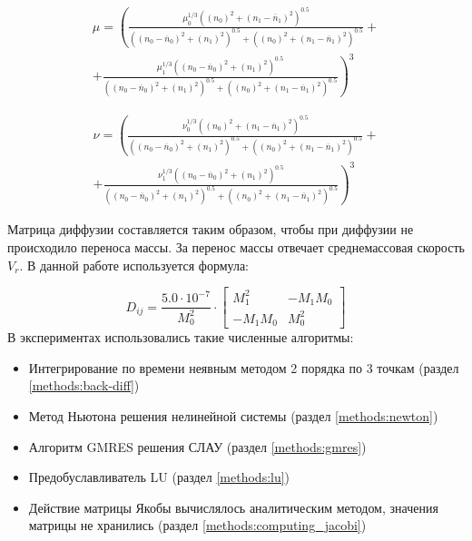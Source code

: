 \begin{multline}
\mu = \left(\frac{\mu_0^{1/3} \left(\left(n_0\right)^{2} + \left(n_1 - \overline n_1\right)^{2}\right)^{0.5}}{\left(\left(n_0 - \overline n_0\right)^{2} + \left(n_1\right)^{2}\right)^{0.5} + \left(\left(n_0\right)^{2} + \left(n_1 - \overline n_1\right)^{2}\right)^{0.5}} + \right.
\\
\left. + \frac{\mu_1^{1/3} \left(\left(n_0 - \overline n_0\right)^{2} + \left(n_1\right)^{2}\right)^{0.5}}{\left(\left(n_0 - \overline n_0\right)^{2} + \left(n_1\right)^{2}\right)^{0.5} + \left(\left(n_0\right)^{2} + \left(n_1 - \overline n_1\right)^{2}\right)^{0.5}}\right)^{3}
\end{multline}

\begin{multline}
\nu = \left(\frac{\nu_0^{1/3} \left(\left(n_0\right)^{2} + \left(n_1 - \overline n_1\right)^{2}\right)^{0.5}}{\left(\left(n_0 - \overline n_0\right)^{2} + \left(n_1\right)^{2}\right)^{0.5} + \left(\left(n_0\right)^{2} + \left(n_1 - \overline n_1\right)^{2}\right)^{0.5}} + \right.
\\
\left. + \frac{\nu_1^{1/3} \left(\left(n_0 - \overline n_0\right)^{2} + \left(n_1\right)^{2}\right)^{0.5}}{\left(\left(n_0 - \overline n_0\right)^{2} + \left(n_1\right)^{2}\right)^{0.5} + \left(\left(n_0\right)^{2} + \left(n_1 - \overline n_1\right)^{2}\right)^{0.5}}\right)^{3}
\end{multline}
\par
Матрица диффузии составляется таким образом, чтобы при диффузии не происходило переноса массы. За перенос массы отвечает среднемассовая скорость $V_r$. В данной работе используется формула:

\begin{equation}
    D_{ij} = \frac{5.0 \cdot 10^{-7}}{M^2_0} \cdot \left[\begin{matrix} M_1^{2} & - M_1 M_0\\- M_1 M_0 & M_0^2 \end{matrix}\right]
\end{equation}
В экспериментах использовались такие численные алгоритмы:
\begin{itemize}
\item Интегрирование по времени неявным методом 2 порядка по 3 точкам (раздел \ref{methods:back-diff})
\item Метод Ньютона решения нелинейной системы (раздел \ref{methods:newton})
\item Алгоритм GMRES решения СЛАУ (раздел \ref{methods:gmres})
\item Предобуславливатель LU (раздел \ref{methods:lu})
\item Действие матрицы Якобы вычислялось аналитическим методом, значения матрицы не хранились (раздел \ref{methods:computing_jacobi})
\end{itemize}

